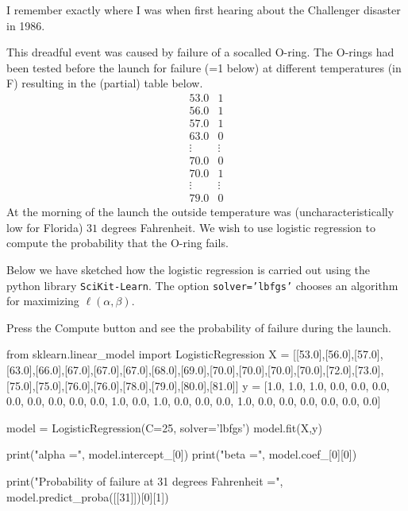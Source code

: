 \documentclass{article}
\begin{document}
\begin{example}\label{challengerexample}
  I remember exactly where I was when first hearing about
  the Challenger disaster in 1986.


  This dreadful event was caused by failure of a socalled O-ring. The
  O-rings had been tested before the launch for failure (=1 below) at different
  temperatures (in F) resulting in the (partial) table below.
  $$
  \begin{matrix}
    53.0 & 1\\
    56.0 & 1\\
    57.0 & 1\\
    63.0 & 0\\
    \vdots & \vdots\\
    70.0 & 0\\
    70.0 & 1\\
    \vdots & \vdots\\
    79.0 & 0
  \end{matrix}
  $$
   At the morning of the launch the outside temperature was
   (uncharacteristically low for Florida) $31$ degrees Fahrenheit. We
   wish to use logistic regression to compute the probability that the
   O-ring fails.

   Below we have sketched how the logistic regression is carried out using the python library \texttt{SciKit-Learn}.
   The option \texttt{solver='lbfgs'} chooses an algorithm for maximizing $\ell(\alpha, \beta)$.
   
   Press the
   Compute button and see the probability of failure during the launch.
   
   
   \begin{sage}
from sklearn.linear_model import LogisticRegression 
X = [[53.0],[56.0],[57.0],[63.0],[66.0],[67.0],[67.0],[67.0],[68.0],[69.0],[70.0],[70.0],[70.0],[70.0],[72.0],[73.0],[75.0],[75.0],[76.0],[76.0],[78.0],[79.0],[80.0],[81.0]]
y = [1.0, 1.0, 1.0, 0.0, 0.0, 0.0, 0.0, 0.0, 0.0, 0.0, 0.0, 1.0, 0.0, 1.0, 0.0, 0.0, 0.0, 1.0, 0.0, 0.0, 0.0, 0.0, 0.0, 0.0]

model = LogisticRegression(C=25, solver='lbfgs')
model.fit(X,y)

print("alpha =", model.intercept_[0])
print("beta =", model.coef_[0][0])

print("Probability of failure at 31 degrees Fahrenheit =", model.predict_proba([[31]])[0][1])
\end{sage}  
\end{example}
\end{document}
